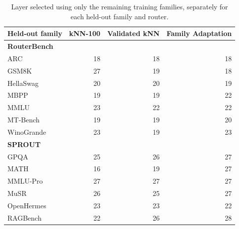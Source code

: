 \begin{table}[H]
\centering\small
\setlength{\tabcolsep}{6pt}
\caption{Layer selected using only the remaining training families, separately for each held-out family and router.}
\label{tab:layer-selected-families}
\begin{tabular}{@{}lrrr@{}}
\toprule
Held-out family & kNN-100 & Validated kNN & Family Adaptation \\
\midrule

\multicolumn{4}{l}{\textbf{RouterBench}} \\

ARC & 18 & 18 & 18 \\

GSM8K & 27 & 19 & 18 \\

HellaSwag & 20 & 20 & 19 \\

MBPP & 19 & 19 & 22 \\

MMLU & 23 & 22 & 22 \\

MT-Bench & 19 & 19 & 20 \\

WinoGrande & 23 & 19 & 23 \\

\midrule

\multicolumn{4}{l}{\textbf{SPROUT}} \\

GPQA & 25 & 26 & 27 \\

MATH & 16 & 19 & 27 \\

MMLU-Pro & 27 & 27 & 27 \\

MuSR & 26 & 25 & 27 \\

OpenHermes & 23 & 23 & 22 \\

RAGBench & 22 & 26 & 28 \\

\bottomrule
\end{tabular}
\end{table}
